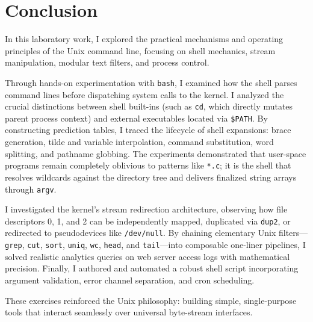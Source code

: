 \documentclass{labreport}
\begin{document}
\section{Conclusion}

In this laboratory work, I explored the practical mechanisms and operating principles of the Unix command line, focusing on shell mechanics, stream manipulation, modular text filters, and process control.

Through hands-on experimentation with \texttt{bash}, I examined how the shell parses command lines before dispatching system calls to the kernel. I analyzed the crucial distinctions between shell built-ins (such as \texttt{cd}, which directly mutates parent process context) and external executables located via \texttt{\$PATH}. By constructing prediction tables, I traced the lifecycle of shell expansions: brace generation, tilde and variable interpolation, command substitution, word splitting, and pathname globbing. The experiments demonstrated that user-space programs remain completely oblivious to patterns like \texttt{*.c}; it is the shell that resolves wildcards against the directory tree and delivers finalized string arrays through \texttt{argv}.

I investigated the kernel's stream redirection architecture, observing how file descriptors 0, 1, and 2 can be independently mapped, duplicated via \texttt{dup2}, or redirected to pseudodevices like \texttt{/dev/null}. By chaining elementary Unix filters---\texttt{grep}, \texttt{cut}, \texttt{sort}, \texttt{uniq}, \texttt{wc}, \texttt{head}, and \texttt{tail}---into composable one-liner pipelines, I solved realistic analytics queries on web server access logs with mathematical precision. Finally, I authored and automated a robust shell script incorporating argument validation, error channel separation, and cron scheduling.

These exercises reinforced the Unix philosophy: building simple, single-purpose tools that interact seamlessly over universal byte-stream interfaces.
\end{document}
